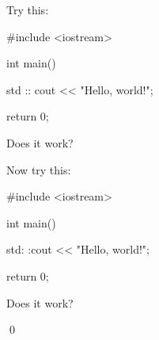 Try this:

\begin{console}

#include <iostream>



int main()

{

    std :: cout << "Hello, world!\n";



    return 0;

}

\end{console}

Does it work?

Now try this:

\begin{console}

#include <iostream>



int main()

{

    std:     :cout << "Hello, world!\n";



    return 0;

}

\end{console}

Does it work?

\qed

